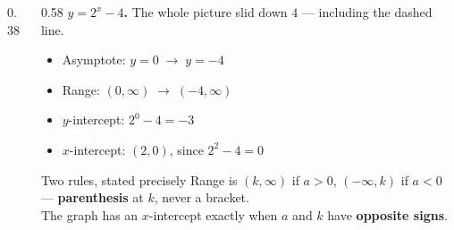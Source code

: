 \documentclass[aspectratio=169, 11pt]{beamer}
\newcommand{\lgrid}[4]{%
  \draw[step=1, linegray!45, thin] (#1,#3) grid (#2,#4);
  \draw[->, thick, charcoal] (#1,0)--(#2,0) node[below right, font=\tiny]{$x$};
  \draw[->, thick, charcoal] (0,#3)--(0,#4) node[left, font=\tiny]{$y$};}
\newcommand{\expgraph}[6]{\draw[very thick, forest, domain=#5:#6, samples=140, smooth]
  plot (\x,{(#1)*exp((#2)*((\x)-(#3)))+(#4)});}
\newcommand{\hasym}[3]{\draw[navy, dashed, thick] (#1,#3)--(#2,#3);}
\begin{document}
\begin{frame}[t, plain]
  \begin{columns}[T]
    \begin{column}{0.38\textwidth}
      \centering
    \end{column}
    \begin{column}{0.58\textwidth}
      \footnotesize
      \textbf{$y=2^{x}-4$.} The whole picture slid down $4$ --- including the dashed line.
      \begin{itemize}\setlength{\itemsep}{3pt}
        \item Asymptote: $y=0 \;\longrightarrow\; y=-4$
        \item Range: $(0,\infty) \;\longrightarrow\; (-4,\infty)$
        \item $y$-intercept: $2^{0}-4=-3$
        \item $x$-intercept: $(2,0)$, since $2^{2}-4=0$
      \end{itemize}
      \vspace{3pt}
      \begin{block}{Two rules, stated precisely}
        Range is $(k,\infty)$ if $a>0$, $(-\infty,k)$ if $a<0$ --- \textbf{parenthesis} at $k$, never a
        bracket. \\[3pt]
        The graph has an $x$-intercept exactly when $a$ and $k$ have \textbf{opposite signs}.
      \end{block}
    \end{column}
  \end{columns}
\end{frame}
\end{document}

